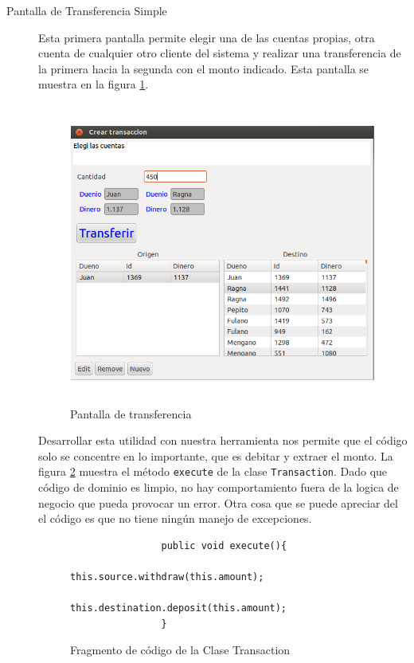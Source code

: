 \begin{description}

	\item[Pantalla de Transferencia Simple]
		Esta primera pantalla permite elegir una de las cuentas propias, otra cuenta
		de cualquier otro cliente del sistema y realizar una transferencia de la
		primera hacia la segunda con el monto indicado. Esta pantalla se
		muestra en la figura \ref{trasferenciaSimple}.
		
		\begin{figure}[h]
			\centering
			\includegraphics[width=450px, height=375px]{img/simple-transferencia}
			\caption{Pantalla de transferencia}
			\label{trasferenciaSimple}
		\end{figure}

		Desarrollar esta utilidad con nuestra herramienta nos permite que el código
		solo se concentre en lo importante, que es debitar y extraer el monto. 
		La figura \ref{executeTransaction} muestra el método  \lstinline|execute| de la
		clase \lstinline|Transaction|. 
		Dado que código de dominio es limpio, no hay comportamiento fuera de la logica
		de negocio que pueda provocar un error. Otra cosa que se puede apreciar del el
		código es que no tiene ningún manejo de excepciones.

		\begin{figure}[h]
			\begin{lstlisting}
				public void execute(){
					this.source.withdraw(this.amount);
					this.destination.deposit(this.amount);
				}
			\end{lstlisting}
			\caption{Fragmento de código de la Clase Transaction}
			\label{executeTransaction}
		\end{figure}
		 

\end{description}
